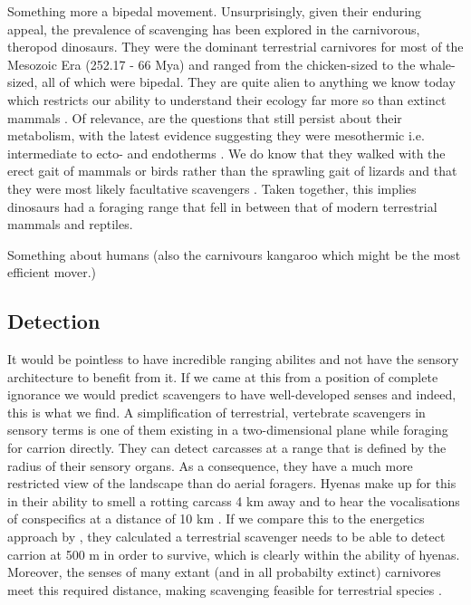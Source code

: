 \documentclass[a4paper,12pt]{article}
\begin{document}
Something more a bipedal movement.
Unsurprisingly, given their enduring appeal, the prevalence of scavenging has been explored in the carnivorous, theropod dinosaurs.
They were the dominant terrestrial carnivores for most of the Mesozoic Era (252.17 - 66 Mya) and ranged from the chicken-sized to the whale-sized, all of which were bipedal.
They are quite alien to anything we know today which restricts our ability to understand their ecology far more so than extinct mammals \citep{weishampel2004dinosauria}.
Of relevance, are the questions that still persist about their metabolism, with the latest evidence suggesting they were mesothermic i.e. intermediate to ecto- and endotherms \citep{grady2014evidence}. 
We do know that they walked with the erect gait of mammals or birds rather than the sprawling gait of lizards and that they were most likely facultative scavengers \citep{weishampel2004dinosauria,depalma2013physical}. %
Taken together, this implies dinosaurs had a foraging range that fell in between that of modern terrestrial mammals and reptiles. 


Something about humans (also the carnivours kangaroo which might be the most efficient mover.)




\subsection*{Detection}
It would be pointless to have incredible ranging abilites and not have the sensory architecture to benefit from it.
If we came at this from a position of complete ignorance we would predict scavengers to have well-developed senses and indeed, this is what we find. 
A simplification of terrestrial, vertebrate scavengers in sensory terms is one of them existing in a two-dimensional plane while foraging for carrion directly.
They can detect carcasses at a range that is defined by the radius of their sensory organs. %
As a consequence, they have a much more restricted view of the landscape than do aerial foragers.
Hyenas make up for this in their ability to smell a rotting carcass 4 km away and to hear the vocalisations of conspecifics at a distance of 10 km \citep{mills1989comparative}. 
If we compare this to the energetics approach by \cite{ruxton2004obligate}, they calculated a terrestrial scavenger needs to be able to detect carrion at 500 m in order to survive, which is clearly within the ability of hyenas.  
Moreover, the senses of many extant (and in all probabilty extinct) carnivores meet this required distance, making scavenging feasible for terrestrial species \citep{farlow1994speculations,mech2010wolves}. 
\end{document}
